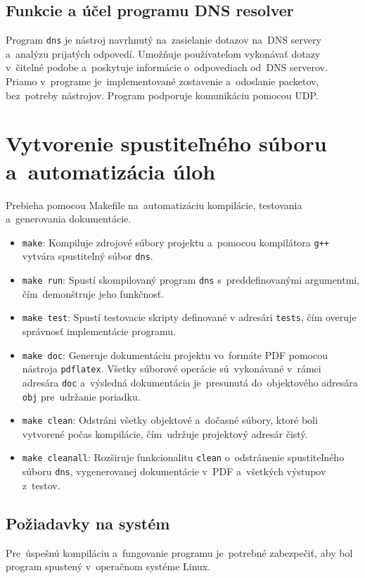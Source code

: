 \documentclass[a4paper, 11pt]{article}
\begin{document}
	\subsection{Funkcie a účel programu DNS resolver}
	Program \texttt{dns} je nástroj navrhnutý na~zasielanie dotazov na~DNS servery a~analýzu prijatých odpovedí. Umožňuje používateľom vykonávať dotazy v~čitelné podobe a~poskytuje informácie o~odpovediach od~DNS serverov. Priamo v~programe je~implementované zostavenie a~odoslanie packetov, bez~potreby nástrojov. Program podporuje komunikáciu pomocou UDP.	

	\section{Vytvorenie spustiteľného súboru a~automatizácia úloh}
	Prebieha pomocou Makefile na~automatizáciu kompilácie, testovania a~generovania dokumentácie. 
	\begin{itemize}
		\item \texttt{make}: Kompiluje zdrojové súbory projektu a~pomocou kompilátora \texttt{g++} vytvára spustiteľný súbor \texttt{dns}.
		\item \texttt{make run}: Spustí skompilovaný program \texttt{dns} s~preddefinovanými argumentmi, čím~demonštruje jeho funkčnosť.
		\item \texttt{make test}: Spustí testovacie skripty definované v adresári \texttt{tests}, čím overuje správnosť implementácie programu.
		\item \texttt{make doc}: Generuje dokumentáciu projektu vo~formáte PDF pomocou nástroja \texttt{pdflatex}. Všetky súborové operácie sú~vykonávané v~rámci adresára \texttt{doc} a~výsledná dokumentácia je~presunutá do~objektového adresára \texttt{obj} pre~udržanie poriadku.
		\item \texttt{make clean}: Odstráni všetky objektové a~dočasné súbory, ktoré boli vytvorené počas kompilácie, čím~udržuje projektový adresár čistý.
		\item \texttt{make cleanall}: Rozširuje funkcionalitu \texttt{clean} o~odstránenie spustiteľného súboru \texttt{dns}, vygenerovanej dokumentácie v~PDF a~všetkých výstupov z~testov.
	\end{itemize}
	\subsection{Požiadavky na systém}
	Pre~úspešnú kompiláciu a~fungovanie programu je~potrebné zabezpečiť, aby bol program spustený v~operačnom systéme Linux.
	
\end{document}
